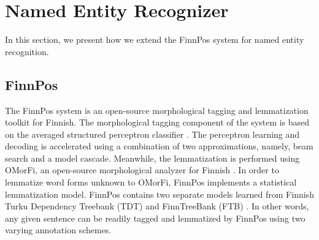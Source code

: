 \documentclass[11pt]{article}
\begin{document}






\section{Named Entity Recognizer}
\label{sec: named entity recognizer}

In this section, we present how we extend the FinnPos system \citep{silfverberg2015} for named entity recognition.


\subsection{FinnPos}

The FinnPos system \citep{silfverberg2015} is an open-source morphological tagging and lemmatization toolkit for Finnish. The morphological tagging component of the system is based on the averaged structured perceptron classifier \citep{collins2002}. The perceptron learning and decoding is accelerated using a combination of two approximations, namely, beam search and a model cascade. Meanwhile, the lemmatization is performed using OMorFi, an open-source morphological analyzer for Finnish \citep{pirinen2008}. In order to lemmatize word forms unknown to OMorFi, FinnPos implements a statistical lemmatization model. FinnPos contains two separate models learned from Finnish Turku Dependency Treebank (TDT) \citep{} and FinnTreeBank (FTB) \citep{}. In other words, any given sentence can be readily tagged and lemmatized by FinnPos using two varying annotation schemes. 
\end{document}
